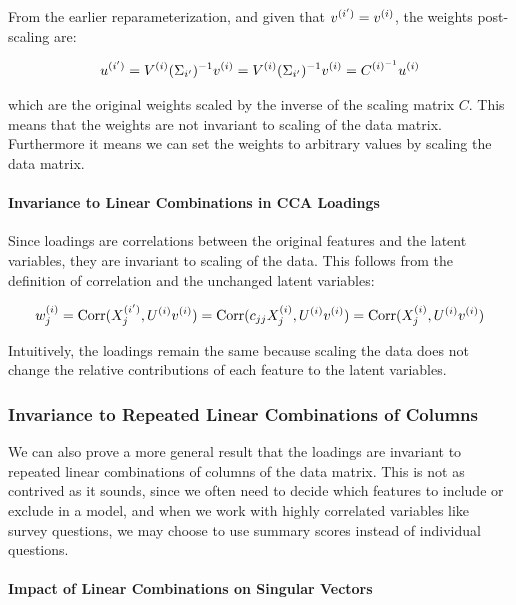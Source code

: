 From the earlier reparameterization, and given that $v^{(i')}=v^{(i)}$, the weights post-scaling are:

\begin{align}
    u^{(i')} = V^{(i)}(\Sigma_{i'})^{-1}v^{(i)} = V^{(i)}(\Sigma_{i'})^{-1}v^{(i)} = C^{{(i)}^{-1}}u^{(i)} \label{eq:weights_change2}
\end{align}

which are the original weights scaled by the inverse of the scaling matrix \( C \).
This means that the weights are not invariant to scaling of the data matrix.
Furthermore it means we can set the weights to arbitrary values by scaling the data matrix.

\paragraph{Invariance to Linear Combinations in CCA Loadings}

Since \gls{loadings} are correlations between the original features and the latent variables, they are invariant to scaling of the data.
This follows from the definition of correlation and the unchanged latent variables:

\begin{align}
    w^{(i)}_j = \operatorname{Corr}(X^{(i')}_j, U^{(i)}v^{(i)}) = \operatorname{Corr}(c_{jj}X^{(i)}_j, U^{(i)}v^{(i)}) = \operatorname{Corr}(X^{(i)}_j, U^{(i)}v^{(i)}) \label{eq:loading_invariant}
\end{align}

Intuitively, the \gls{loadings} remain the same because scaling the data does not change the relative contributions of each feature to the latent variables.

\subsubsection{Invariance to Repeated Linear Combinations of Columns}\label{subsubsec:invariance-to-linear-combinations}

We can also prove a more general result that the \gls{loadings} are invariant to repeated linear combinations of columns of the data matrix.
This is not as contrived as it sounds, since we often need to decide which features to include or exclude in a model, and when we work with highly correlated variables like survey questions, we may choose to use summary scores instead of individual questions.

\paragraph{Impact of Linear Combinations on Singular Vectors}

